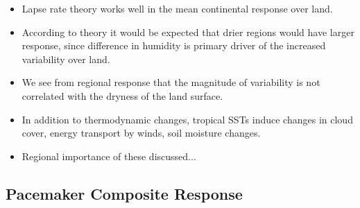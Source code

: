 \begin{itemize}
	\item Lapse rate theory works well in the mean continental response over 
		land.
	\item According to theory it would be expected that drier regions would have 
		larger response, since difference in humidity is primary driver of the 
		increased variability over land.
	\item We see from regional response that the magnitude of variability is not 
		correlated with the dryness of the land surface.
	\item In addition to thermodynamic changes, tropical SSTs induce changes in 
		cloud cover, energy transport by winds, soil moisture changes.
	\item Regional importance of these discussed...
\end{itemize}

\newpage

\subsection{Pacemaker Composite Response}

